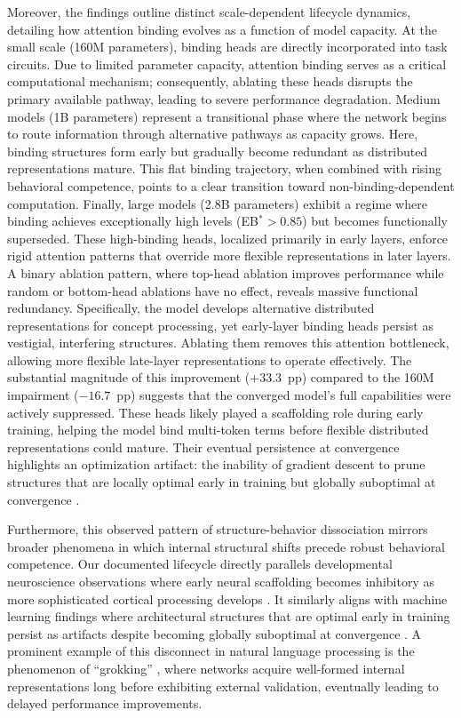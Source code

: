 \documentclass[10pt]{article} %
\begin{document}
Moreover, the findings outline distinct scale-dependent lifecycle dynamics, detailing how attention binding evolves as a function of model capacity. At the small scale (160M parameters), binding heads are directly incorporated into task circuits. Due to limited parameter capacity, attention binding serves as a critical computational mechanism; consequently, ablating these heads disrupts the primary available pathway, leading to severe performance degradation. Medium models (1B parameters) represent a transitional phase where the network begins to route information through alternative pathways as capacity grows. Here, binding structures form early but gradually become redundant as distributed representations mature. This flat binding trajectory, when combined with rising behavioral competence, points to a clear transition toward non-binding-dependent computation. Finally, large models (2.8B parameters) exhibit a regime where binding achieves exceptionally high levels (EB$^*>0.85$) but becomes functionally superseded. These high-binding heads, localized primarily in early layers, enforce rigid attention patterns that override more flexible representations in later layers. A binary ablation pattern, where top-head ablation improves performance while random or bottom-head ablations have no effect, reveals massive functional redundancy. Specifically, the model develops alternative distributed representations for concept processing, yet early-layer binding heads persist as vestigial, interfering structures. Ablating them removes this attention bottleneck, allowing more flexible late-layer representations to operate effectively. The substantial magnitude of this improvement ($+33.3$~pp) compared to the 160M impairment ($-16.7$~pp) suggests that the converged model's full capabilities were actively suppressed. These heads likely played a scaffolding role during early training, helping the model bind multi-token terms before flexible distributed representations could mature. Their eventual persistence at convergence highlights an optimization artifact: the inability of gradient descent to prune structures that are locally optimal early in training but globally suboptimal at convergence \citep{frankle2019lottery}.

Furthermore, this observed pattern of structure-behavior dissociation mirrors broader phenomena in which internal structural shifts precede robust behavioral competence. Our documented lifecycle directly parallels developmental neuroscience observations where early neural scaffolding becomes inhibitory as more sophisticated cortical processing develops \citep{huttenlocher2002neural}. It similarly aligns with machine learning findings where architectural structures that are optimal early in training persist as artifacts despite becoming globally suboptimal at convergence \citep{frankle2019lottery}. A prominent example of this disconnect in natural language processing is the phenomenon of ``grokking'' \citep{power2022grokking}, where networks acquire well-formed internal representations long before exhibiting external validation, eventually leading to delayed performance improvements.
\end{document}
